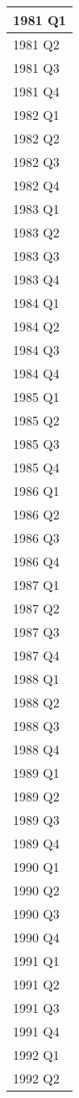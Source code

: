 \documentclass[
]{article}
\begin{document}
\begin{tabular}{l}
\hline
1981 Q1\\
\hline
1981 Q2\\
\hline
1981 Q3\\
\hline
1981 Q4\\
\hline
1982 Q1\\
\hline
1982 Q2\\
\hline
1982 Q3\\
\hline
1982 Q4\\
\hline
1983 Q1\\
\hline
1983 Q2\\
\hline
1983 Q3\\
\hline
1983 Q4\\
\hline
1984 Q1\\
\hline
1984 Q2\\
\hline
1984 Q3\\
\hline
1984 Q4\\
\hline
1985 Q1\\
\hline
1985 Q2\\
\hline
1985 Q3\\
\hline
1985 Q4\\
\hline
1986 Q1\\
\hline
1986 Q2\\
\hline
1986 Q3\\
\hline
1986 Q4\\
\hline
1987 Q1\\
\hline
1987 Q2\\
\hline
1987 Q3\\
\hline
1987 Q4\\
\hline
1988 Q1\\
\hline
1988 Q2\\
\hline
1988 Q3\\
\hline
1988 Q4\\
\hline
1989 Q1\\
\hline
1989 Q2\\
\hline
1989 Q3\\
\hline
1989 Q4\\
\hline
1990 Q1\\
\hline
1990 Q2\\
\hline
1990 Q3\\
\hline
1990 Q4\\
\hline
1991 Q1\\
\hline
1991 Q2\\
\hline
1991 Q3\\
\hline
1991 Q4\\
\hline
1992 Q1\\
\hline
1992 Q2\\

\end{tabular}
\end{document}
